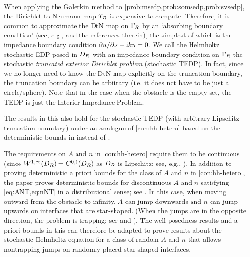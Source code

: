 
\label{rem:tedp}

\

When applying the Galerkin method to \cref{prob:msedp,prob:somsedp,prob:svsedp}, the Dirichlet-to-Neumann map $T_{R}$ is expensive to compute. Therefore, it is
common to approximate the DtN map on $\Gamma_{R}$ by an `absorbing
boundary condition' (see, e.g., \cite[Section 3.3]{Ih:98} and the references
therein), the  simplest of which is the impedance boundary condition
$\partial u/\partial \nu - \mathrm{i} k u=0$. We call the Helmholtz stochastic EDP posed in $D_{R}$ with
an impedance boundary condition on $\Gamma_{R}$ the stochastic \emph{truncated
exterior Dirichlet problem} (stochastic TEDP). In fact, since we no longer need to know
the DtN map explicitly on the truncation boundary, the truncation
boundary can be arbitrary (i.e. it does not have to be just a circle/sphere). Note that in the case when the obstacle is the empty set, the TEDP is just the Interior Impedance Problem.

The results in this  also hold for the stochastic TEDP (with arbitrary Lipschitz truncation boundary) under an analogue of \cref{con:hh-hetero} based on the deterministic bounds in \cite[Theorem A.6(i)]{GrPeSp:19} instead of \cite[Theorem 2.5]{GrPeSp:19}.
\ere

\label{rem:jumps}
The requirements on $A$ and $n$ in \cref{con:hh-hetero} require them to be continuous (since  $\WoiDR = \CzoDR$ as $D_{R}$ is Lipschitz; see, e.g., \cite[Section 4.2.3, Theorem 5]{EvGa:92}). In addition to proving deterministic a priori bounds for the class of $A$ and $n$ in \cref{con:hh-hetero}, the paper \cite{GrPeSp:19} proves deterministic bounds for discontinuous $A$ and $n$ satisfying \cref{eq:ANT,eq:nNT} in a distributional sense; see \cite[Theorem 2.7]{GrPeSp:19}. In this case, when moving outward from the obstacle to infinity,  $A$ can jump downwards and $n$ can
jump upwards on interfaces that are star-shaped. (When the jumps are in the opposite direction, the problem is trapping; see \cite{PoVo:99a} and \cite[Section 6]{MoSp:19}). The
well-posedness results and a priori bounds in this  can therefore be adapted to prove results about the stochastic Helmholtz equation
for a class of random $A$ and $n$ that allows nontrapping jumps on randomly-placed star-shaped interfaces.
\ere

